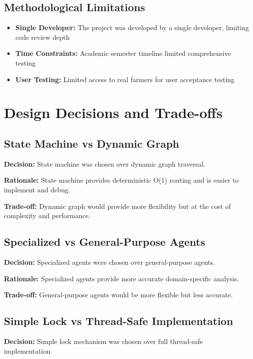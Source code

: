 \subsection{Methodological Limitations}

\begin{itemize}
    \item \textbf{Single Developer:} The project was developed by a single developer, limiting code review depth
    \item \textbf{Time Constraints:} Academic semester timeline limited comprehensive testing
    \item \textbf{User Testing:} Limited access to real farmers for user acceptance testing
\end{itemize}

\section{Design Decisions and Trade-offs}

\subsection{State Machine vs Dynamic Graph}

\textbf{Decision:} State machine was chosen over dynamic graph traversal.

\textbf{Rationale:} State machine provides deterministic O(1) routing and is easier to implement and debug.

\textbf{Trade-off:} Dynamic graph would provide more flexibility but at the cost of complexity and performance.

\subsection{Specialized vs General-Purpose Agents}

\textbf{Decision:} Specialized agents were chosen over general-purpose agents.

\textbf{Rationale:} Specialized agents provide more accurate domain-specific analysis.

\textbf{Trade-off:} General-purpose agents would be more flexible but less accurate.

\subsection{Simple Lock vs Thread-Safe Implementation}

\textbf{Decision:} Simple lock mechanism was chosen over full thread-safe implementation.

